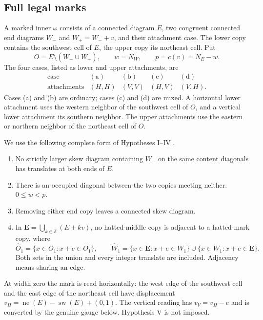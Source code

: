 \documentclass[11pt,a4paper]{amsart}
\numberwithin{equation}{section}
\theoremstyle{plain}
\theoremstyle{definition}
\newcommand{\Z}{\mathbb Z}
\begin{document}
\subsection{Full legal marks}

A marked inner \(\omega\) consists of a connected diagram \(E\), two congruent connected end diagrams \(W_-\) and \(W_+=W_-+v\), and their attachment case.  The lower copy contains the southwest cell of \(E\), the upper copy its northeast cell.  Put
\[
 O=E\setminus(W_-\cup W_+),\qquad w=N_W,\qquad p=c(v)=N_E-w.
\]
The four cases, listed as lower and upper attachments, are
\begin{equation}\label{eq:cases}
 \begin{array}{c|cccc}
 \text{case}&\mathrm{(a)}&\mathrm{(b)}&\mathrm{(c)}&\mathrm{(d)}\\\hline
 \text{attachments}&(H,H)&(V,V)&(H,V)&(V,H).
 \end{array}
\end{equation}
Cases (a) and (b) are ordinary; cases (c) and (d) are mixed.  A horizontal lower attachment uses the western neighbor of the southwest cell of \(O\), and a vertical lower attachment its southern neighbor.  The upper attachments use the eastern or northern neighbor of the northeast cell of \(O\).

We use the following complete form of Hypotheses I--IV \cite{McNamara2009Classification,Shields2026Gluing}.
\begin{enumerate}
\item[(I)] No strictly larger skew diagram containing \(W_-\) on the same content diagonals has translates at both ends of \(E\).
\item[(II)] There is an occupied diagonal between the two copies meeting neither: \(0\le w<p\).
\item[(III)] Removing either end copy leaves a connected skew diagram.
\item[(IV)] In \(\boldsymbol E=\bigcup_{k\in\Z}(E+kv)\), no hatted-middle copy is adjacent to a hatted-mark copy, where
\begin{equation}\label{eq:full-hats}
 \widehat O_1=\{x\in O_1:x+e\in O_1\},\qquad
 \widehat W_1=\{x\in\boldsymbol E:x+e\in W_1\}
 \cup\{x\in W_1:x+e\in\boldsymbol E\}.
\end{equation}
Both sets in the union and every integer translate are included.  Adjacency means sharing an edge.
\end{enumerate}
At width zero the mark is read horizontally: the west edge of the southwest cell and the east edge of the northeast cell have displacement
\(v_H=\operatorname{ne}(E)-\operatorname{sw}(E)+(0,1)\).
The vertical reading has \(v_V=v_H-e\) and is converted by the genuine gauge below.  Hypothesis V is not imposed.
\end{document}
